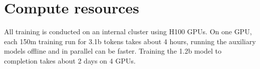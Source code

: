 \documentclass{article}
\begin{document}
\section{Compute resources}\label{sec:cluster}
All training is conducted on an internal cluster using H100 GPUs. On one GPU, each 150m training run for 3.1b tokens takes about 4 hours, running the auxiliary models offline and in parallel can be faster. Training the 1.2b model to completion takes about 2 days on 4 GPUs. 


% 
\end{document}
